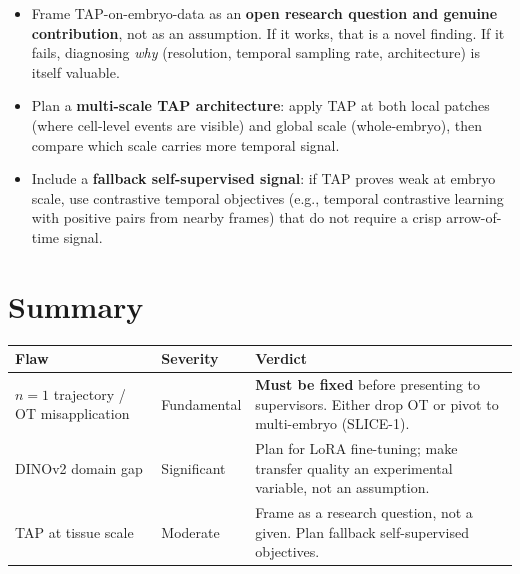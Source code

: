 \documentclass{article}
\begin{document}
\begin{itemize}
	\item Frame TAP-on-embryo-data as an \textbf{open research question and
		      genuine contribution}, not as an assumption. If it works, that is a
	      novel finding. If it fails, diagnosing \emph{why} (resolution,
	      temporal sampling rate, architecture) is itself valuable.
	\item Plan a \textbf{multi-scale TAP architecture}: apply TAP at both
	      local patches (where cell-level events are visible) and global scale
	      (whole-embryo), then compare which scale carries more temporal signal.
	\item Include a \textbf{fallback self-supervised signal}: if TAP proves
	      weak at embryo scale, use contrastive temporal objectives (e.g.,
	      temporal contrastive learning with positive pairs from nearby frames)
	      that do not require a crisp arrow-of-time signal.
\end{itemize}

\section{Summary}

\begin{center}
	\begin{tabular}{|l|l|p{7.5cm}|}
		\hline
		\textbf{Flaw}                          & \textbf{Severity} & \textbf{Verdict} \\
		\hline
		$n{=}1$ trajectory / OT misapplication & Fundamental       &
		\textbf{Must be fixed} before presenting to supervisors. Either drop OT or
		pivot to multi-embryo (SLICE-1).                                              \\
		\hline
		DINOv2 domain gap                      & Significant       &
		Plan for LoRA fine-tuning; make transfer quality an experimental variable,
		not an assumption.                                                            \\
		\hline
		TAP at tissue scale                    & Moderate          &
		Frame as a research question, not a given. Plan fallback self-supervised
		objectives.                                                                   \\
		\hline
	\end{tabular}
\end{center}
\end{document}
